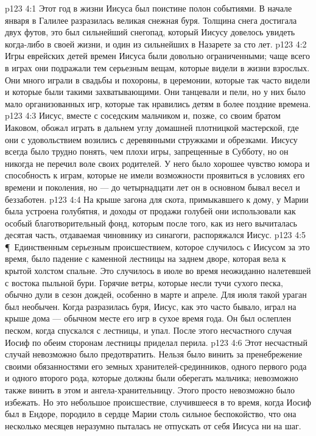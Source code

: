 \vs p123 4:1 Этот год в жизни Иисуса был поистине полон событиями. В начале января в Галилее разразилась великая снежная буря. Толщина снега достигала двух футов, это был сильнейший снегопад, который Иисусу довелось увидеть когда\hyp{}либо в своей жизни, и один из сильнейших в Назарете за сто лет.
\vs p123 4:2 Игры еврейских детей времен Иисуса были довольно ограниченными; чаще всего в играх они подражали тем серьезным вещам, которые видели в жизни взрослых. Они много играли в свадьбы и похороны, в церемонии, которые так часто видели и которые были такими захватывающими. Они танцевали и пели, но у них было мало организованных игр, которые так нравились детям в более поздние времена.
\vs p123 4:3 Иисус, вместе с соседским мальчиком и, позже, со своим братом Иаковом, обожал играть в дальнем углу домашней плотницкой мастерской, где они с удовольствием возились с деревянными стружками и обрезками. Иисусу всегда было трудно понять, чем плохи игры, запрещенные в Субботу, но он никогда не перечил воле своих родителей. У него было хорошее чувство юмора и способность к играм, которые не имели возможности проявиться в условиях его времени и поколения, но --- до четырнадцати лет он в основном бывал весел и беззаботен.
\vs p123 4:4 На крыше загона для скота, примыкавшего к дому, у Марии была устроена голубятня, и доходы от продажи голубей они использовали как особый благотворительный фонд, которым после того, как из него вычиталась десятая часть, отдаваемая чиновнику из синагоги, распоряжался Иисус.
\vs p123 4:5 \P\ Единственным серьезным происшествием, которое случилось с Иисусом за это время, было падение с каменной лестницы на заднем дворе, которая вела к крытой холстом спальне. Это случилось в июле во время неожиданно налетевшей с востока пыльной бури. Горячие ветры, которые несли тучи сухого песка, обычно дули в сезон дождей, особенно в марте и апреле. Для июля такой ураган был необычен. Когда разразилась буря, Иисус, как это часто бывало, играл на крыше дома --- обычном месте его игр в сухое время года. Он был ослеплен песком, когда спускался с лестницы, и упал. После этого несчастного случая Иосиф по обеим сторонам лестницы приделал перила.
\vs p123 4:6 Этот несчастный случай невозможно было предотвратить. Нельзя было винить за пренебрежение своими обязанностями его земных хранителей\hyp{}срединников, одного первого рода и одного второго рода, которые должны были оберегать мальчика; невозможно также винить в этом и ангела\hyp{}хранительницу. Этого просто невозможно было избежать. Но это небольшое происшествие, случившееся в то время, когда Иосиф был в Ендоре, породило в сердце Марии столь сильное беспокойство, что она несколько месяцев неразумно пыталась не отпускать от себя Иисуса ни на шаг.
